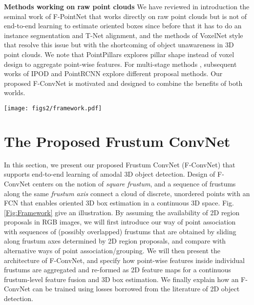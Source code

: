 \documentclass[letterpaper, 10 pt, conference]{ieeeconf}
\begin{document}
\noindent\textbf{Methods working on raw point clouds} We have reviewed in introduction the seminal work of F-PointNet \cite{qi2018frustum} that works directly on raw point clouds but is not of end-to-end learning to estimate oriented boxes since before that it has to do an instance segmentation and T-Net alignment, and the methods of VoxelNet style \cite{zhou2018voxelnet,  yan2018second, lang2018pointpillars} that resolve this issue but with the shortcoming of object unawareness in 3D point clouds. We note that PointPillars \cite{lang2018pointpillars} explores pillar shape instead of voxel design to aggregate point-wise features. For multi-stage methods \cite{qi2018frustum, yang2018ipod, shi2018pointrcnn}, subsequent works of IPOD \cite{yang2018ipod} and PointRCNN \cite{shi2018pointrcnn} explore different proposal methods. Our proposed F-ConvNet is motivated and designed to combine the benefits of both worlds.

\begin{figure*}
	\begin{center}
	\texttt{[image: figs2/framework.pdf]}
	\caption[]{The whole framework of our F-ConvNet. We group points and extract features by PointNet from a sequence of frustums, and for 3D box estimation, frustum-level features are re-formed as a 2D feature map for use of our fully convolutional network (FCN) and detection header (CLS and REG). (a) The architecture of PointNet. (b) The architecture of FCN used in Frustum ConvNet for KITTI dataset. Each convolutional layer is followed by Batch Normalization and ReLU nonlinearity. Blue-colored bar in (b) represents the 2D feature map of arrayed frustum-level feature vectors. }
	\label{Fig:Framework}
	\end{center}
	\vspace{-0.5cm}
\end{figure*}
\section{The Proposed Frustum ConvNet}

In this section, we present our proposed Frustum ConvNet (F-ConvNet) that supports end-to-end learning of amodal 3D object detection. Design of F-ConvNet centers on the notion of \emph{square frustum}, and a sequence of frustums along the same \emph{frustum axis} connect a cloud of discrete, unordered points with an FCN that enables oriented 3D box estimation in a continuous 3D space. Fig.\ref{Fig:Framework} give an illustration. By assuming the availability of 2D region proposals in RGB images, we will first introduce our way of point association with sequences of (possibly overlapped) frustums that are obtained by sliding along frustum axes determined by 2D region proposals, and compare with alternative ways of point association/grouping. We will then present the architecture of F-ConvNet, and specify how point-wise features inside individual frustums are aggregated and re-formed as 2D feature maps for a continuous frustum-level feature fusion and 3D box estimation. We finally explain how an F-ConvNet can be trained using losses borrowed from the literature of 2D object detection.
\end{document}
